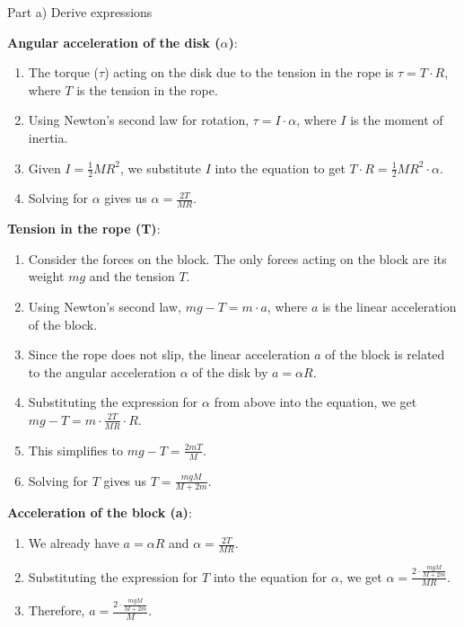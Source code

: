 \documentclass[a4paper,11pt]{article}
\begin{document}
Part a) Derive expressions

\textbf{Angular acceleration of the disk (\( \alpha \))}:
\begin{enumerate}
    \item The torque (\( \tau \)) acting on the disk due to the tension in the rope is \( \tau = T \cdot R \), where \( T \) is the tension in the rope.
    \item Using Newton's second law for rotation, \( \tau = I \cdot \alpha \), where \( I \) is the moment of inertia.
    \item Given \( I = \frac{1}{2} M R^2 \), we substitute \( I \) into the equation to get \( T \cdot R = \frac{1}{2} M R^2 \cdot \alpha \).
    \item Solving for \( \alpha \) gives us \( \alpha = \frac{2T}{M R} \).
\end{enumerate}

\textbf{Tension in the rope (T)}:
\begin{enumerate}
    \item Consider the forces on the block. The only forces acting on the block are its weight \( mg \) and the tension \( T \).
    \item Using Newton's second law, \( mg - T = m \cdot a \), where \( a \) is the linear acceleration of the block.
    \item Since the rope does not slip, the linear acceleration \( a \) of the block is related to the angular acceleration \( \alpha \) of the disk by \( a = \alpha R \).
    \item Substituting the expression for \( \alpha \) from above into the equation, we get \( mg - T = m \cdot \frac{2T}{M R} \cdot R \).
    \item This simplifies to \( mg - T = \frac{2mT}{M} \).
    \item Solving for \( T \) gives us \( T = \frac{mgM}{M + 2m} \).
\end{enumerate}

\textbf{Acceleration of the block (a)}:
\begin{enumerate}
    \item We already have \( a = \alpha R \) and \( \alpha = \frac{2T}{M R} \).
    \item Substituting the expression for \( T \) into the equation for \( \alpha \), we get \( \alpha = \frac{2 \cdot \frac{mgM}{M + 2m}}{M R} \).
    \item Therefore, \( a = \frac{2 \cdot \frac{mgM}{M + 2m}}{M} \).
\end{enumerate}
\end{document}
